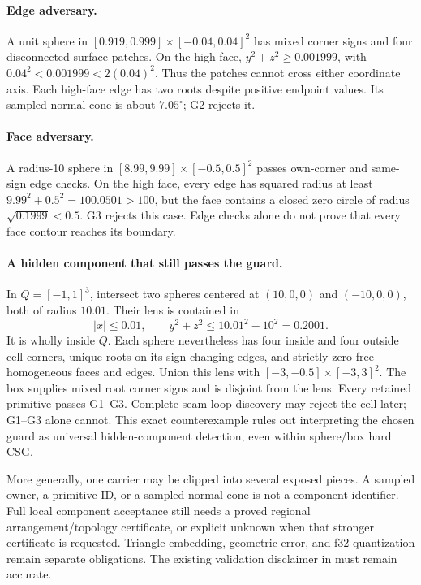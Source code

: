 \documentclass[11pt]{article}
\begin{document}
\paragraph{Edge adversary.}
A unit sphere in
\([0.919,0.999]\times[-0.04,0.04]^2\) has mixed corner signs and four
disconnected surface patches. On the high face,
\(y^2+z^2\ge 0.001999\), with
\(0.04^2<0.001999<2(0.04)^2\). Thus the patches cannot cross either
coordinate axis. Each high-face edge has two roots despite positive endpoint
values. Its sampled normal cone is about \(7.05^\circ\); G2 rejects it.

\paragraph{Face adversary.}
A radius-10 sphere in
\([8.99,9.99]\times[-0.5,0.5]^2\) passes own-corner and same-sign edge
checks. On the high face, every edge has squared radius at least
\(9.99^2+0.5^2=100.0501>100\), but the face contains a closed zero circle
of radius \(\sqrt{0.1999}<0.5\). G3 rejects this case. Edge checks alone
do not prove that every face contour reaches its boundary.

\paragraph{A hidden component that still passes the guard.}
In \(Q=[-1,1]^3\), intersect two spheres centered at
\((10,0,0)\) and \((-10,0,0)\), both of radius \(10.01\). Their lens is
contained in
\[
 |x|\le0.01,\qquad y^2+z^2\le 10.01^2-10^2=0.2001.
\]
It is wholly inside \(Q\). Each sphere nevertheless has four inside and four
outside cell corners, unique roots on its sign-changing edges, and strictly
zero-free homogeneous faces and edges. Union this lens with
\([-3,-0.5]\times[-3,3]^2\). The box supplies mixed root corner signs and
is disjoint from the lens. Every retained primitive passes G1--G3.
Complete seam-loop discovery may reject the cell later; G1--G3 alone cannot.
This exact counterexample rules out interpreting the chosen guard as universal
hidden-component detection, even within sphere/box hard CSG.

More generally, one carrier may be clipped into several exposed pieces.
A sampled owner, a primitive ID, or a sampled normal cone is not a component
identifier. Full local component acceptance still needs a proved regional
arrangement/topology certificate, or explicit unknown when that stronger
certificate is requested. Triangle embedding, geometric error, and f32
quantization remain separate obligations. The existing validation disclaimer
in  must remain accurate.
\end{document}
